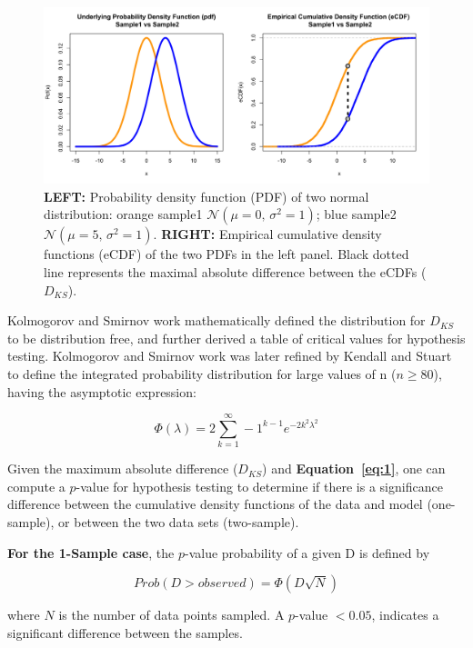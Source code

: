 \documentclass[codesnippet]{jss}
\begin{document}
\begin{figure}[t!]
\centering
\includegraphics{pdfvsCDF}
\caption{\label{fig:kstest1D} \textbf{LEFT:} Probability density function (PDF) of two normal distribution: orange sample1 $\mathcal{N}(\mu = 0,\,\sigma^{2} = 1)$; blue sample2 $\mathcal{N}(\mu = 5,\,\sigma^{2} = 1)$. \textbf{RIGHT:} Empirical cumulative density functions (eCDF) of the two PDFs in the left panel. Black dotted line represents the maximal absolute difference between the eCDFs ($D_{KS}$).
}
\end{figure}

Kolmogorov and Smirnov work mathematically defined the distribution for $D_{KS}$ to be distribution free, and further derived a table of critical values for hypothesis testing. Kolmogorov and Smirnov work was later refined by Kendall and Stuart ~\citep{Kendall1946} to define the integrated probability distribution for large values of n  ($n \geq 80$), having the asymptotic expression:

\begin{equation} \label{eq:1}
\Phi(\lambda) = 2 \sum_{k=1}^{\infty} -1^{k-1}e^{-2k^2\lambda^2}
\end{equation}

Given the maximum absolute difference ($D_{KS}$) and \textbf{Equation~\ref{eq:1}}, one can  compute a $p$-value for  hypothesis testing to determine if there is a significance difference between the cumulative density functions of the data and model (one-sample), or between the two data sets (two-sample).

\textbf{For the 1-Sample case}, the $p$-value probability of a given D is defined by

\begin{equation} \label{eq:2}
Prob(D > observed) = \Phi ( D\sqrt{N})
\end{equation}

where $N$ is the number of data points sampled. A $p$-value $< 0.05$, indicates a significant difference between the samples.
\end{document}
